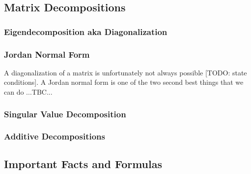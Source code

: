 \subsection{Matrix Decompositions}


\subsubsection{Eigendecomposition aka Diagonalization}


\subsubsection{Jordan Normal Form}
A diagonalization of a matrix is unfortunately not always possible [TODO: state conditions]. A Jordan normal form is one of the two second best things that we can do ...TBC...


\subsubsection{Singular Value Decomposition}



\subsubsection{Additive Decompositions}



\subsection{Important Facts and Formulas}